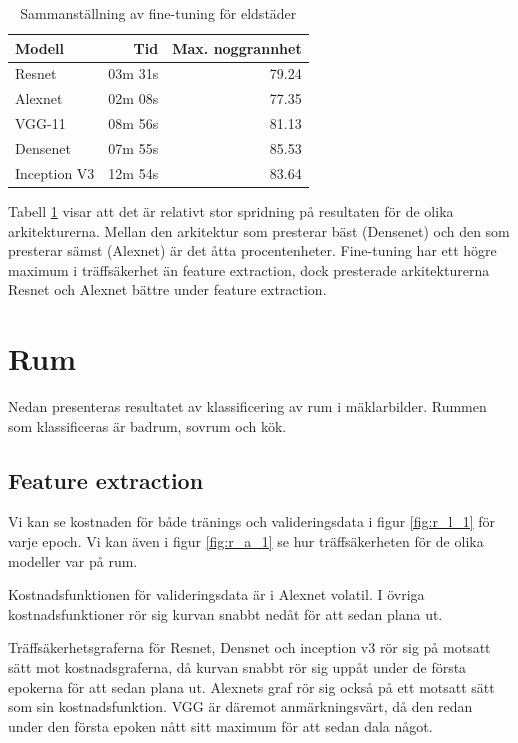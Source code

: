 \documentclass[]{kththesis}
\begin{document}
\begin{table}[!htbp]
  \centering
  \begin{tabular}{|l|r|r|}
    Modell & Tid & Max. noggrannhet \\ 
    \hline
    Resnet       & 03m 31s & 79.24 \\
    Alexnet      & 02m 08s & 77.35 \\
    VGG-11       & 08m 56s & 81.13 \\
    Densenet     & 07m 55s & 85.53 \\
    Inception V3 & 12m 54s & 83.64 \\
  \end{tabular}
  \caption{Sammanställning av fine-tuning för eldstäder}
  \label{fig:sam_4}  
\end{table}

Tabell \ref{fig:sam_4} visar att det är relativt stor spridning på resultaten för de olika arkitekturerna.
Mellan den arkitektur som presterar bäst (Densenet) och den som presterar sämst (Alexnet) är det åtta procentenheter. Fine-tuning har ett högre maximum i träffsäkerhet än feature extraction, dock presterade arkitekturerna Resnet och Alexnet bättre under feature extraction.

\section{Rum}
Nedan presenteras resultatet av klassificering av rum i mäklarbilder. 
Rummen som klassificeras är badrum, sovrum och kök.

\subsection{Feature extraction}
Vi kan se kostnaden för både tränings och valideringsdata i figur \ref{fig:r_l_1} för varje epoch. Vi kan även  i figur \ref{fig:r_a_1} se hur träffsäkerheten för de olika modeller var på rum.

Kostnadsfunktionen för valideringsdata är i Alexnet volatil. 
I övriga kostnadsfunktioner rör sig kurvan snabbt nedåt för att sedan plana ut.

Träffsäkerhetsgraferna för Resnet, Densnet och inception v3 rör sig på motsatt sätt mot kostnadsgraferna, då kurvan snabbt rör sig uppåt under de första epokerna för att sedan plana ut.
Alexnets graf rör sig också på ett motsatt sätt som sin kostnadsfunktion. 
VGG är däremot anmärkningsvärt, då den redan under den första epoken nått sitt maximum för att sedan dala något.
\end{document}
